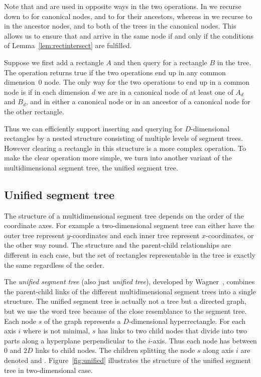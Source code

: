 \documentclass[english,gradu]{tktltiki2018}
\begin{document}
Note that \subtree{} and \subtreep{} are used in opposite ways in the two operations.
In \adddt{} we recurse down to \subtree{} for canonical nodes, and to \subtreep{} for their ancestors, whereas in \checkdt{} we recurse to \subtree{} in the ancestor nodes, and to both of the trees in the canonical nodes.
This allows us to ensure that \adddt{} and \checkdt{} arrive in the same node if and only if the conditions of Lemma~\ref{lem:rectintersect} are fulfilled.

Suppose we first add a rectangle $A$ and then query for a rectangle $B$ in the tree.
The \checkdt operation returns true if the two operations end up in any common dimension~0 node.
The only way for the two operations to end up in a common node is if in each dimension $d$ we are in a canonical node of at least one of $A_d$ and $B_d$, and in either a canonical node or in an ancestor of a canonical node for the other rectangle.

Thus we can efficiently support inserting and querying for $D$-dimensional rectangles by a nested structure consisting of multiple levels of segment trees.
However clearing a rectangle in this structure is a more complex operation.
To make the clear operation more simple, we turn into another variant of the multidimensional segment tree, the unified segment tree.

\subsection{Unified segment tree}\label{sec:unifiedtree}

The structure of a multidimensional segment tree depends on the order of the coordinate axes.
For example a two-dimensional segment tree can either have the outer tree represent $y$-coordinates and each inner tree represent $x$-coordinates, or the other way round.
The structure and the parent-child relationships are different in each case, but the set of rectangles representable in the tree is exactly the same regardless of the order.

The \emph{unified segment tree} (also just \emph{unified tree}), developed by Wagner~\cite{unified}, combines the parent-child links of the different multidimensional segment trees into a single structure.
The unified segment tree is actually not a tree but a directed graph, but we use the word tree because of the close resemblance to the segment tree.
Each node $s$ of the graph represents a $D$-dimensional hyperrectangle.
For each axis $i$ where  is not minimal, $s$ has links to two child nodes that divide  into two parts along a hyperplane perpendicular to the $i$-axis.
Thus each node has between 0 and $2D$ links to child nodes.
The children splitting the node $s$ along axis $i$ are denoted  and .
Figure~\ref{fig:unified} illustrates the structure of the unified segment tree in two-dimensional case.
\end{document}
